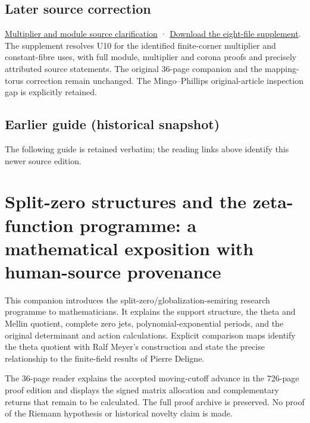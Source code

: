 \documentclass[
]{article}
\begin{document}
\subsection{Later source correction}\label{later-source-correction}

\href{https://github.com/KokunoYumeto/zeta-function-research-reader/blob/main/workbenches/splitzero-tandem/source-corrections/20260917-multiplier-functoriality/README.md}{Multiplier
and module source clarification} ·
\href{https://raw.githubusercontent.com/KokunoYumeto/zeta-function-research-reader/main/workbenches/splitzero-tandem/source-corrections/20260917-multiplier-functoriality/multiplier-source-clarification-2026-09-17.zip}{Download
the eight-file supplement}. The supplement resolves U10 for the
identified finite-corner multiplier and constant-fibre uses, with full
module, multiplier and corona proofs and precisely attributed source
statements. The original 36-page companion and the mapping-torus
correction remain unchanged. The Mingo--Phillips original-article
inspection gap is explicitly retained.

\subsection{Earlier guide (historical
snapshot)}\label{earlier-guide-historical-snapshot-5}

The following guide is retained verbatim; the reading links above
identify this newer source edition.

\section{Split-zero structures and the zeta-function programme: a
mathematical exposition with human-source
provenance}\label{split-zero-structures-and-the-zeta-function-programme-a-mathematical-exposition-with-human-source-provenance}

This companion introduces the split-zero/globalization-semiring research
programme to mathematicians. It explains the support structure, the
theta and Mellin quotient, complete zero jets, polynomial-exponential
periods, and the original determinant and action calculations. Explicit
comparison maps identify the theta quotient with Ralf Meyer's
construction and state the precise relationship to the finite-field
results of Pierre Deligne.

The 36-page reader explains the accepted moving-cutoff advance in the
726-page proof edition and displays the signed matrix allocation and
complementary returns that remain to be calculated. The full proof
archive is preserved. No proof of the Riemann hypothesis or historical
novelty claim is made.
\end{document}
